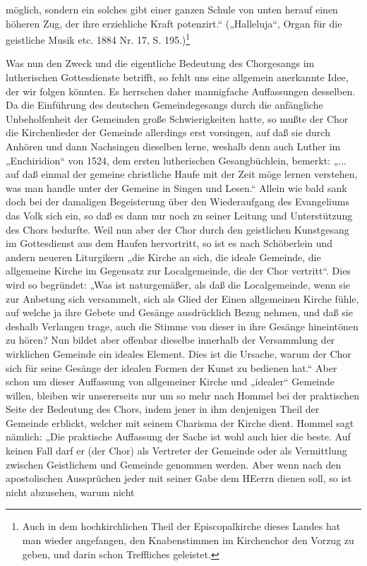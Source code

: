möglich, sondern ein solches gibt einer ganzen Schule von unten herauf einen höheren Zug, der ihre erziehliche Kraft
potenzirt.“ („Halleluja“, Organ für die geistliche Musik etc. 1884 Nr. 17, S. 195.)\footnote{Auch in dem hochkirchlichen Theil der Episcopalkirche dieses Landes hat man wieder angefangen, den Knabenstimmen im Kirchenchor den Vorzug zu geben, und darin schon Treffliches geleistet.}

Was nun den Zweck und die eigentliche Bedeutung des Chorgesangs im lutherischen Gottesdienste betrifft, so fehlt uns eine allgemein anerkannte Idee, der wir folgen könnten. Es herrschen daher mannigfache Auffassungen desselben. Da die Einführung des deutschen Gemeindegesangs durch die anfängliche Unbeholfenheit der Gemeinden große Schwierigkeiten hatte, so mußte der Chor die Kirchenlieder der Gemeinde allerdings erst vorsingen, auf daß sie durch Anhören und dann Nachsingen dieselben lerne, weshalb denn auch Luther im „Enchiridion“ von 1524, dem ersten lutherischen Gesangbüchlein, bemerkt: „... auf daß einmal der gemeine christliche Haufe mit der Zeit möge lernen verstehen, was man handle unter der Gemeine in Singen und Lesen.“ Allein wie bald sank doch bei der damaligen Begeisterung über den Wiederaufgang des Evangeliums das Volk sich ein, so daß es dann nur noch zu seiner Leitung und Unterstützung des Chors bedurfte. Weil nun aber der Chor durch den geistlichen Kunstgesang im Gottesdienst aus dem Haufen hervortritt, so ist es nach Schöberlein und andern neueren Liturgikern „die Kirche an sich, die ideale Gemeinde, die allgemeine Kirche im Gegensatz zur Localgemeinde, die der Chor vertritt“. Dies wird so begründet: „Was ist naturgemäßer, als daß die Localgemeinde, wenn sie zur Anbetung sich versammelt, sich als Glied der Einen allgemeinen Kirche fühle, auf welche ja ihre Gebete und Gesänge ausdrücklich Bezug nehmen, und daß sie deshalb Verlangen trage, auch die Stimme von dieser in ihre Gesänge hineintönen zu hören? Nun bildet aber offenbar dieselbe innerhalb der Versammlung der wirklichen Gemeinde ein ideales Element. Dies ist die Ursache, warum der Chor sich für seine Gesänge der idealen Formen der Kunst zu bedienen hat.“ Aber schon um dieser Auffassung von allgemeiner Kirche und „idealer“ Gemeinde willen, bleiben wir unsererseits nur um so mehr nach Hommel bei der praktischen Seite der Bedeutung des Chors, indem jener in ihm denjenigen Theil der Gemeinde erblickt, welcher mit seinem Charisma der Kirche dient. Hommel sagt nämlich: „Die praktische Auffassung der Sache ist wohl auch hier die beste. Auf keinen Fall darf er (der Chor) als Vertreter der Gemeinde oder als Vermittlung zwischen Geistlichem und Gemeinde genommen werden. Aber wenn nach den apostolischen Aussprüchen jeder mit seiner Gabe dem HEerrn dienen soll, so ist nicht abzusehen, warum nicht
